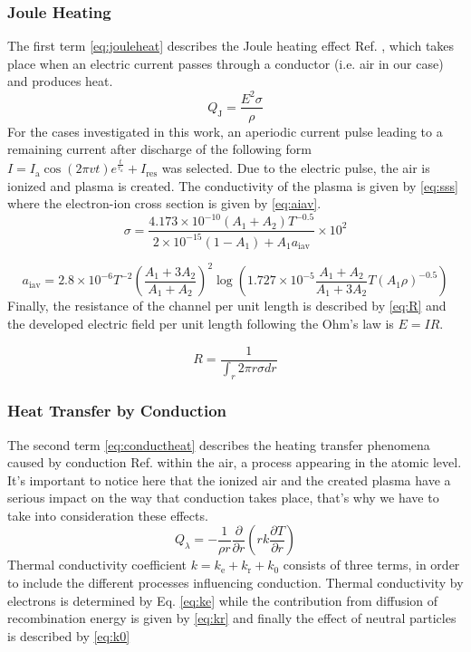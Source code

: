 \documentclass{warpdoc}
\begin{document}
\subsubsection{Joule Heating}
The first term \eqref{eq:jouleheat} describes the Joule heating effect Ref. \cite{plooster}, which takes place when an electric current passes through a conductor (i.e. air in our case) and produces heat.
\begin{equation}
    Q_\text{J}=\frac{E^2\sigma}{\rho}\label{eq:jouleheat}
\end{equation}
 For the cases investigated in this work, an aperiodic current pulse leading to a remaining current after discharge of the following form $I=I_\text{a}\cos(2\pi vt)e^{\frac{t}{\tau_a}}+I_\text{res}$  was selected. Due to the electric pulse, the air is ionized and plasma is created. The conductivity of the plasma is given by \eqref{eq:sss} where the electron-ion cross section is given by \eqref{eq:aiav}.
\begin{equation}
    \sigma=\frac{4.173\times10^{-10}(A_1+A_2)T^{-0.5}}{2\times10^{-15}(1-A_1)+A_1a_\text{iav}}\times10^2\label{eq:sss}
\end{equation}

\begin{equation}
    a_\text{iav}=2.8\times10^{-6}T^{-2}
    \left(\frac{A_1+3A_2}{A_1+A_2}\right)^2\log\left(1.727\times10^{-5}\frac{A_1+A_2}{A_1+3A_2}T(A_1\rho )^{-0.5}\right)\label{eq:aiav}
\end{equation}
Finally, the resistance of the channel per unit length is described by \eqref{eq:R} and the developed electric field per unit length following the Ohm's law is $ E=IR$.

\begin{equation}
    R=\frac{1}{\int_{r}2\pi r\sigma dr}\label{eq:R}
\end{equation}

\subsubsection{Heat Transfer by Conduction}
The second term \eqref{eq:conductheat} describes the heating transfer phenomena caused by conduction Ref. \cite{plooster} within the air, a process appearing in the atomic level. It's important to notice here that the ionized air and the created plasma have a serious impact on the way that conduction takes place, that's why we have to take into consideration these effects. 
\begin{equation}
     Q_{\lambda}=-\frac{1}{\rho r}\frac{\partial}{\partial r}\left(rk\frac{{\partial}T}{\partial r}\right)\label{eq:conductheat}
\end{equation}
Thermal conductivity coefficient $k=k_\text{e}+k_\text{r}+k_0$ consists of three terms, in order to include the different processes influencing conduction. Thermal conductivity by electrons is determined by Eq. \eqref{eq:ke} while the contribution from diffusion of recombination energy is given by \eqref{eq:kr} and finally the effect of neutral particles is described by \eqref{eq:k0}
\end{document}
